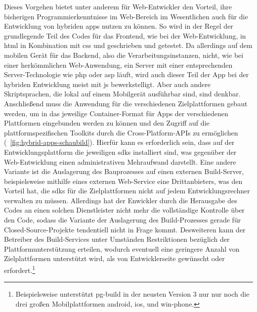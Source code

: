 Dieses Vorgehen bietet unter anderem für Web-Entwickler den Vorteil, ihre bisherigen Programmierkenntnisse im Web-Bereich im Wesentlichen auch für die Entwicklung von hybriden \glspl{app} nutzen zu können. 
So wird in der Regel der grundlegende Teil des Codes für das Frontend, wie bei der Web-Entwicklung, in \gls{html} in Kombination mit \gls{css} und  geschrieben und getestet. 
Da allerdings auf dem mobilen Gerät für das Backend, also die Verarbeitungsinstanzen, nicht, wie bei einer herkömmlichen Web-Anwendung, ein Server mit einer entsprechenden Server-Technologie wie \gls{php} oder \gls{asp} läuft, wird auch dieser Teil der App bei der hybriden Entwicklung meist mit \gls{js} bewerkstelligt. Aber auch andere Skriptsprachen, die lokal auf einem Mobilgerät ausführbar sind, sind denkbar.  %
Anschließend muss die Anwendung für die verschiedenen Zielplattformen gebaut werden, um in das jeweilige Container-Format für Apps der verschiedenen Plattformen eingebunden werden zu können und den Zugriff auf die plattformspezifischen Toolkits durch die Cross-Platform-APIs zu ermöglichen (\seename\ \autoref{fig:hybrid-apps-schaubild}).
Hierfür kann es erforderlich sein, dass auf der Entwicklungsplattform die jeweiligen \glspl{sdk} installiert sind, was gegenüber der Web-Entwicklung einen administrativen Mehraufwand darstellt.
Eine andere Variante ist die Auslagerung des Bauprozesses auf einen externen Build-Server, beispielsweise mithilfe eines externen Web-Service eine Drittanbieters, was den Vorteil hat, die \glspl{sdk} für die Zielplattformen nicht auf jedem Entwicklungsrechner verwalten zu müssen. 
Allerdings hat der Enwickler durch die Herausgabe des Codes an einen solchen Dienstleister nicht mehr die vollständige Kontrolle über den Code, sodass die Variante der Auslagerung des Build-Prozesses gerade für Closed-Source-Projekte tendentiell nicht in Frage kommt. 
Desweiteren kann der Betreiber des Build-Services unter Umständen Restriktionen bezüglich der Plattformunterstützung erteilen, wodurch eventuell eine geringere Anzahl von Zielplattformen unterstützt wird, als von Entwicklerseite gewünscht oder erfordert.\footnote{Beispielsweise unterstützt \gls{pg-build} in der neusten Version 3 nur nur noch die drei großen Mobilplattformen \gls{android}, \gls{ios}, und \gls{win-phone}.}

